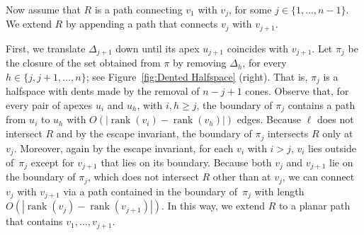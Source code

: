 \documentclass[11pt]{patmorin}
\DeclareMathOperator{\rank}{rank}
\begin{document}
Now assume that $R$ is a path connecting $v_1$ with $v_j$, for some $j\in \{1,\dots,n-1\}$. We extend $R$ by appending a
path that connects $v_j$ with $v_{j+1}$.

First, we translate $\Delta_{j+1}$ down until its apex $u_{j+1}$ coincides with $v_{j+1}$. Let $\pi_j$ be the closure of the set obtained from $\pi$ by removing $\Delta_h$, for every $h\in\{j,j+1,\ldots,n\}$; see Figure~\ref{fig:Dented Halfspace} (right). That is, $\pi_j$ is a halfspace with dents made by the removal of $n-j+1$ cones.
Observe that, for every pair of apexes $u_i$ and $u_h$, with $i,h\geq j$, the boundary of $\pi_j$
contains a path from $u_i$ to $u_h$ with $O(|\rank(v_i)-\rank(v_h)|)$ edges.
Because $\ell$ does not intersect $R$ and by the escape invariant, the boundary of $\pi_j$ intersects $R$ only at $v_j$. Moreover, again by the escape invariant, for each $v_i$ with $i > j$, $v_i$ lies outside of~$\pi_j$ except for $v_{j+1}$ that lies on its boundary. Because both $v_j$ and $v_{j+1}$ lie on the boundary of $\pi_j$, which does not intersect $R$ other than at $v_j$, we can connect $v_j$ with $v_{j+1}$ via a path contained in the boundary of~$\pi_j$ with length $O(|\rank(v_j) - \rank(v_{j+1})|)$. In this way, we extend $R$ to a planar path that contains $v_1,\ldots,v_{j+1}$.
\end{document}
